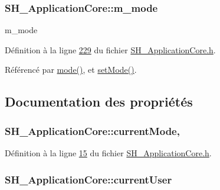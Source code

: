 \hypertarget{classSH__ApplicationCore_ac9587a451ab2294abe7a9eb738d93cb0}{
\subsubsection[{m\-\_\-mode}]{ S\-H\-\_\-\-Application\-Core\-::m\-\_\-mode\hspace{0.3cm}{\ttfamily [private]}}}\label{classSH__ApplicationCore_ac9587a451ab2294abe7a9eb738d93cb0}


m\-\_\-mode 



Définition à la ligne \hyperlink{SH__ApplicationCore_8h_source_l00229}{229} du fichier \hyperlink{SH__ApplicationCore_8h_source}{S\-H\-\_\-\-Application\-Core.\-h}.



Référencé par \hyperlink{classSH__ApplicationCore_a210295d4d7a6e16e9def6e0a29816b51}{mode()}, et \hyperlink{classSH__ApplicationCore_aeb87d289ccc9c8209928f23cf8a02ead}{set\-Mode()}.



\subsection{Documentation des propriétés}
\hypertarget{classSH__ApplicationCore_a5b51b2abe52d58a11a0a8bb2a95bdbd2}{
\subsubsection[{current\-Mode}]{ S\-H\-\_\-\-Application\-Core\-::current\-Mode\hspace{0.3cm}{\ttfamily [read]}, {\ttfamily [write]}}}\label{classSH__ApplicationCore_a5b51b2abe52d58a11a0a8bb2a95bdbd2}


Définition à la ligne \hyperlink{SH__ApplicationCore_8h_source_l00015}{15} du fichier \hyperlink{SH__ApplicationCore_8h_source}{S\-H\-\_\-\-Application\-Core.\-h}.

\hypertarget{classSH__ApplicationCore_afe36b3fd891c706ff1458b2eb7d46c5f}{
\subsubsection[{current\-User}]{ S\-H\-\_\-\-Application\-Core\-::current\-User\hspace{0.3cm}{\ttfamily [read]}}}\label{classSH__ApplicationCore_afe36b3fd891c706ff1458b2eb7d46c5f}


